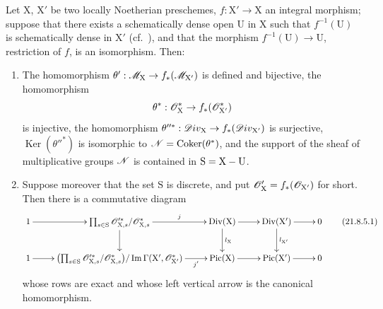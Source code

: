 
\begin{proposition}[21.8.5]
\label{IV.21.8.5}
Let $\mathrm{X}$, $\mathrm{X}'$ be two locally Noetherian preschemes, $f:\mathrm{X}'\to\mathrm{X}$ an integral morphism;
suppose that there exists a schematically dense open $\mathrm{U}$ in $\mathrm{X}$ such that $f^{-1}(\mathrm{U})$ is schematically dense in $\mathrm{X}'$ (cf.\ ), and that the morphism $f^{-1}(\mathrm{U})\to\mathrm{U}$, restriction of $f$, is an isomorphism.
Then:
\begin{enumerate}[label=\textup{(\roman*)}]
  \item The homomorphism $\theta':\mathscr{M}_\mathrm{X}\to f_*(\mathscr{M}_{\mathrm{X}'})$ is defined and bijective, the homomorphism
\[
  \theta^*:\mathscr{O}^*_\mathrm{X}\to f_*(\mathscr{O}^*_{\mathrm{X}'})
\]
is injective, the homomorphism $\theta''^*:\mathscr{D}iv_\mathrm{X}\to f_*(\mathscr{D}iv_{\mathrm{X}'})$ is surjective, $\operatorname{Ker}(\theta''^*)$ is isomorphic to $\mathscr{N}=\operatorname{Coker}(\theta^*)$, and the support of the sheaf of multiplicative groups $\mathscr{N}$ is contained in $\mathrm{S}=\mathrm{X}-\mathrm{U}$.
  \item Suppose moreover that the set $\mathrm{S}$ is discrete, and put $\mathscr{O}'_\mathrm{X}=f_*(\mathscr{O}_{\mathrm{X}'})$ for short.
Then there is a commutative diagram
\[
\label{IV.21.8.5.1}
  \xymatrix{
    1 \ar[r] & \prod_{s\in\mathrm{S}}\sh{O}'^{*}_{\mathrm{X},s}/\sh{O}^*_{\mathrm{X},s} \ar[r]^-{j} \ar[d] & \operatorname{Div}(\mathrm{X}) \ar[r] \ar[d]^{l_\mathrm{X}} & \operatorname{Div}(\mathrm{X}') \ar[r] \ar[d]^{l_{\mathrm{X}'}} & 0\\
    1 \ar[r] & \bigl(\prod_{s\in\mathrm{S}}\sh{O}'^{*}_{\mathrm{X},s}/\sh{O}^*_{\mathrm{X},s}\bigr)/\operatorname{Im}\Gamma(\mathrm{X}',\sh{O}^*_{\mathrm{X}'}) \ar[r]_-{j'} & \operatorname{Pic}(\mathrm{X}) \ar[r] & \operatorname{Pic}(\mathrm{X}') \ar[r] & 0
  }
  \tag{21.8.5.1}
\]
whose rows are exact and whose left vertical arrow is the canonical homomorphism.
\end{enumerate}
\end{proposition}

